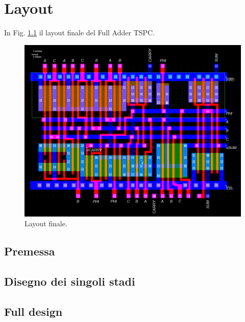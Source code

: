 
\chapter{Layout} %
\label{Chapter4} 

In Fig. \ref{fig:layout} il layout finale del Full Adder TSPC.

\begin{figure}[hbt!]
	\centering
	\includegraphics[width=1\textwidth]{figure/Msk_FullDesign.png}
	\caption{Layout finale.}
	\label{fig:layout}
\end{figure}

\section{Premessa}
\label{sec:sec_Premessa}

\section{Disegno dei singoli stadi}
\label{sec:sec_disegnoStadi}

\section{Full design}
\label{sec:sec_fullDesign}






